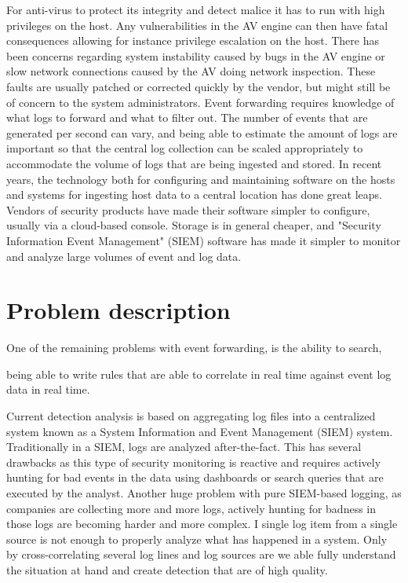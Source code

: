 For anti-virus to protect its integrity and detect malice it has to run with high privileges on the host. Any vulnerabilities in the AV engine can then have fatal consequences allowing for instance privilege escalation on the host. There has been concerns regarding system instability caused by bugs in the AV engine or slow network connections caused by the AV doing network inspection. These faults are usually patched or corrected quickly by the vendor, but might still be of concern to the system administrators. Event forwarding requires knowledge of what logs to forward and what to filter out. The number of events that are generated per second can vary, and being able to estimate the amount of logs are important so that the central log collection can be scaled appropriately to accommodate the volume of logs that are being ingested and stored.
In recent years, the technology both for configuring and maintaining software on the hosts and systems for ingesting host data to a central location has done great leaps. Vendors of security products have made their software simpler to configure, usually via a cloud-based console. Storage is in general cheaper, and "Security Information Event Management" (SIEM) software has made it simpler to monitor and analyze large volumes of event and log data.

\section{Problem description}
\label{sec:problemdescription}


One of the remaining problems with event forwarding, is the ability to search, 

being able to write rules that are able to correlate in real time against event log data in real time.

Current detection analysis is based on aggregating log files into a centralized system known as a System Information and Event Management (SIEM) system. Traditionally in a SIEM, logs are analyzed after-the-fact. This has several drawbacks as this type of security monitoring is reactive and requires actively hunting for bad events in the data using dashboards or search queries that are executed by the analyst.
Another huge problem with pure SIEM-based logging, as companies are collecting more and more logs, actively hunting for badness in those logs are becoming harder and more complex. I single log item from a single source is not enough to properly analyze what has happened in a system. Only by cross-correlating several log lines and log sources are we able fully understand the situation at hand and create detection that are of high quality.

